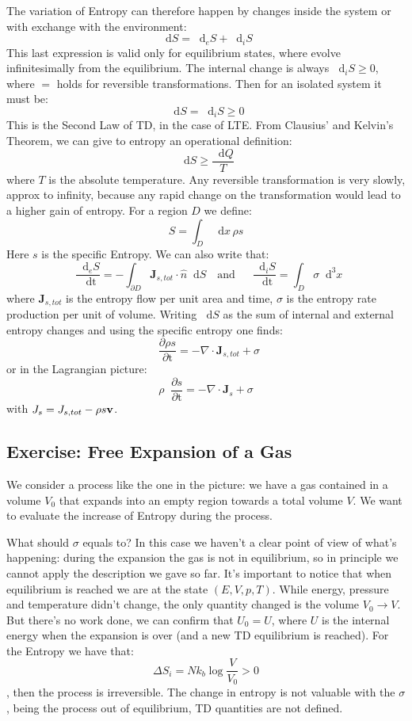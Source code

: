 \documentclass{article}
\newcommand*\diff{\mathop{}\!\mathrm{d}}
\newcommand*\Diff[1]{\mathop{}\!\mathrm{d^#1}}
\newcommand*\Tder[1]{\mathop{}\!\frac{\diff #1}{\diff \mathrm{t}}}
\newcommand*\tder[1]{\mathop{}\!\frac{\partial #1}{\partial \mathrm{t}} }
\begin{document}
The variation of Entropy can therefore happen by changes inside the system or with exchange with the environment:
\begin{equation}
    \diff{S} = \diff_e{S} +\diff_i{S}
\end{equation}
This last expression is valid only for equilibrium states, where evolve infinitesimally from the equilibrium. The internal change is always $\diff_i S \ge 0$, where $=$ holds for reversible transformations. Then for an isolated system it must be:
$$\diff{S} = \diff_i S \ge 0$$
This is the Second Law of TD, in the case of LTE. From Clausius' and Kelvin's Theorem, we can give to entropy an operational definition:
$$\diff{S} \ge \frac{\diff{Q}}{{T}}$$
where $T$ is the absolute temperature. Any reversible transformation is very slowly, approx to infinity, because any rapid change on the transformation would lead to a higher gain of entropy. For a region $D$ we define:
$$S= \int_D\diff{x} \,\rho s $$
Here $s$ is the specific Entropy. We can also write that: 
$$ \Tder{_eS} = - \int_{\partial D} \mathbf{J}_{s,tot} \cdot \hat{n} \diff{S} \quad \mathrm{and} \quad \Tder{_iS} = \int_D {\sigma} \Diff3 x   $$
where $\mathbf{J}_{s,tot}$ is the entropy flow per unit area and time, $\sigma$ is the entropy rate production per unit of volume. Writing $\diff{S}$ as the sum of internal and external entropy changes and using the specific entropy one finds:
$$\tder{\rho s} = -\nabla\cdot \mathbf{J}_{s,tot} + \sigma$$
or in the Lagrangian picture:
\begin{equation}
    \rho \tder{s} = -\nabla \cdot \mathbf{J}_s +\sigma
\end{equation}
with $J_s = J_{s,tot} - \rho s \v_v$. 
\subsection{Exercise: Free Expansion of a Gas}
We consider a process like the one in the picture: we have a gas contained in a volume $V_0$ that expands into an empty region towards a total volume $V$. We want to evaluate the increase of Entropy during the process. 

What should $\sigma$ equals to? In this case we haven't a clear point of view of what's happening: during the expansion the gas is not in equilibrium, so in principle we cannot apply the description we gave so far. It's important to notice that when equilibrium is reached we are at the state $(E,V,p,T)$. While energy, pressure and temperature didn't change, the only quantity changed is the volume $V_0 \xrightarrow{} V$. But there's no work done, we can confirm that $U_0 = U$, where $U$ is the internal energy when the expansion is over (and a new TD equilibrium is reached). For the Entropy we have that:
$$\Delta S_i = N k_b \log \frac{V}{V_0} > 0$$, then the process is irreversible. The change in entropy is not valuable with the $\sigma$, being the process out of equilibrium, TD quantities are not defined. 
\end{document}
